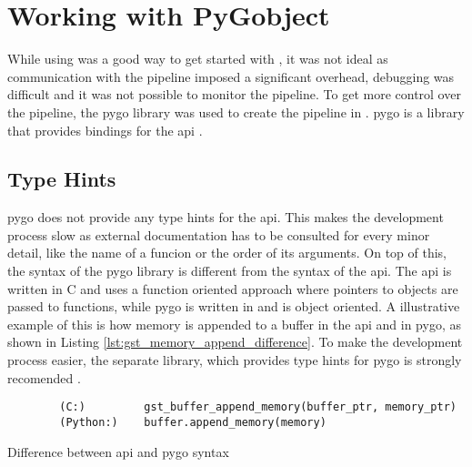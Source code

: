 \section{Working with PyGobject}
While using  was a good way to get started with \gs, it was not ideal as communication with the pipeline imposed a significant overhead, debugging was difficult and it was not possible to monitor the pipeline.
To get more control over the pipeline, the \gls{pygo} library was used to create the pipeline in \py.
\gls{pygo} is a \py library that provides bindings for the \gs \gls{api} \cite{OverviewPyGObject}.

\subsection{Type Hints}
\gls{pygo} does not provide any type hints for the \gs \gls{api}.
This makes the development process slow as external documentation has to be consulted for every minor detail, like the name of a funcion or the order of its arguments.
On top of this, the syntax of the \gls{pygo} library is different from the syntax of the \gs \gls{api}.
The \gls{api} is written in C and uses a function oriented approach where pointers to objects are passed to functions, while \gls{pygo} is written in \py and is object oriented.
A illustrative example of this is how memory is appended to a buffer in the \gs \gls{api} and in \gls{pygo}, as shown in Listing \ref{lst:gst_memory_append_difference}.
To make the development process easier, the separate  library, which provides type hints for \gls{pygo} is strongly recomended \cite{pygobjectTypingStubsPyGObject2023}.

\begin{listing}[H]
    \begin{verbatim}
        (C:)         gst_buffer_append_memory(buffer_ptr, memory_ptr)
        (Python:)    buffer.append_memory(memory)
    \end{verbatim}
    \caption{Difference between \gs \gls{api} and \gls{pygo} syntax}
    \label{lst:gst_memory_append_difference}
\end{listing}
